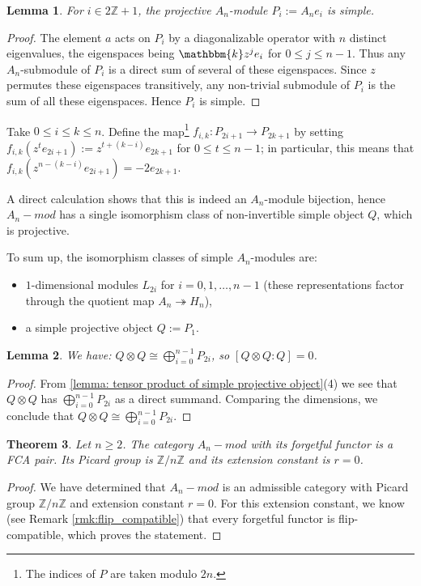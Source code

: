 \documentclass{amsart}
\theoremstyle{plain}%
\newtheorem{lemma}{Lemma}[subsection]
\newtheorem{thm}[lemma]{Theorem}
\theoremstyle{remark}
\newcommand{\1}{\mathbbm{1}}
\newcommand{\Z}{\mathbb{Z}}
\newcommand{\kk}{\mathbbm{k}}
\begin{document}
        \begin{lemma}\label{lem: P_i is simple for odd i}
            For $i \in 2\Z+1$, the projective $A_{n}$-module $P_i:=A_{n}e_i$ is simple.  
        \end{lemma} 
        \begin{proof}
            The element $a$ acts on $P_i$ by a diagonalizable operator with $n$ distinct eigenvalues, the eigenspaces being $\kk z^{j}e_i$ for $0\leq j\leq n-1$. Thus any $A_{n}$-submodule of $P_i$ is a direct sum of several of these eigenspaces. Since $z$ permutes these eigenspaces transitively, any non-trivial submodule of $P_i$ is the sum of all these eigenspaces. Hence $P_i$ is simple.
        \end{proof}
    
       Take $0\leq i\leq k\leq n$. Define the map\footnote{The indices of $P$ are taken modulo $2n$.} $f_{i, k}:P_{2i+1}\to P_{2k+1}$ by setting $f_{i, k}(z^te_{2i+1}) := z^{t+(k-i)}e_{2k+1}$ for $0\le{t}\le{n-1}$; in particular, this means that $f_{i, k}(z^{n-(k-i)}e_{2i+1})=-2e_{2k+1}$. 

        A direct calculation shows that this is indeed an $A_{n}$-module bijection, hence $A_n-mod$ has a single isomorphism class of non-invertible simple object $Q$, which is projective.

        To sum up, the isomorphism classes of simple $A_{n}$-modules are:
        \begin{itemize}
            \item $1$-dimensional modules $L_{2i}$ for $i=0,1, \ldots, n-1$ (these representations factor through the quotient map $A_n\twoheadrightarrow H_n$),
            \item a simple projective object $Q:=P_{1}$.
        \end{itemize}
    \begin{lemma}
        We have: $Q\otimes Q\cong\bigoplus_{i=0}^{n-1} P_{2i}$, so $[Q\otimes Q:Q]=0 $.
    \end{lemma}
    \begin{proof}
      From \cref{lemma: tensor product of simple projective object}(4) we see that $Q\otimes Q$ has $\bigoplus_{i=0}^{n-1} P_{2i}$ as a direct summand. Comparing the dimensions, we conclude that $Q\otimes Q\cong\bigoplus_{i=0}^{n-1} P_{2i}$.
    \end{proof}
  
    
        \begin{thm} \label{thm: basic projective extensions of taft algebras}
        Let $n\geq 2$. The category $A_n-mod$ with its forgetful functor is a FCA pair. Its Picard group is $\Z/n\Z$ and its extension constant is $r=0$.
        \end{thm}
  \begin{proof}
      We have determined that $A_n-mod$ is an admissible category with Picard group $\Z/n\Z$ and extension constant $r=0$. For this extension constant, we know (see Remark \ref{rmk:flip_compatible}) that every forgetful functor is flip-compatible, which proves the statement.
  \end{proof}
\end{document}
